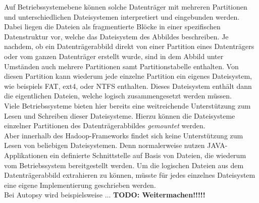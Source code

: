 \noindent
Auf Betriebssystemebene können solche Datenträger mit mehreren Partitionen und unterschiedlichen Dateisystemen interpretiert und eingebunden werden. Dabei liegen die Dateien als fragmentierte Blöcke in einer spezifischen Datenstruktur vor, welche das Dateisystem des Abbildes beschreiben. Je nachdem, ob ein Datenträgerabbild direkt von einer Partition eines Datenträgers oder vom ganzen Datenträger erstellt wurde, sind in dem Abbild unter Umständen auch mehrere Partitionen samt Partitionstabelle enthalten. Von diesen Partition kann wiederum jede einzelne Partition ein eigenes Dateisystem, wie beispiels FAT, ext4, oder NTFS enthalten. Dieses Dateisystem enthält dann die eigentlichen Dateien, welche logisch zusammengesetzt werden müssen.\\ 
Viele Betriebssysteme bieten hier bereits eine weitreichende Unterstützung zum Lesen und Schreiben dieser Dateisysteme. Hierzu können die Dateisysteme einzelner Partitionen des Datenträgerabbildes \textit{gemountet} werden.\\

\noindent
Aber innerhalb des Hadoop-Frameworks findet sich keine Unterstützung zum Lesen von beliebigen Dateisystemen. Denn normalerweise nutzen JAVA-Applikationen ein definierte Schnittstelle auf Basis von Dateien, die wiederum vom Betriebssystem bereitgestellt werden. Um die logischen Dateien aus dem Datenträgerabbild extrahieren zu können, müsste für jedes einzelnes Dateisystem eine eigene Implementierung geschrieben werden.\\ 
Bei Autopsy wird beispielsweise ... \textbf{TODO: Weitermachen!!!!!}\\







